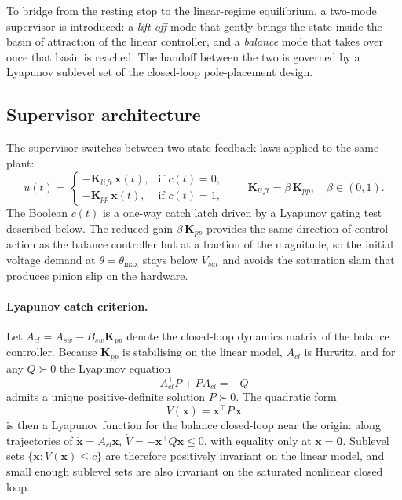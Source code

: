 \documentclass[11pt,a4paper]{article}
\begin{document}
To bridge from the resting stop to the linear-regime equilibrium, a two-mode supervisor is introduced: a \emph{lift-off} mode that gently brings the state inside the basin of attraction of the linear controller, and a \emph{balance} mode that takes over once that basin is reached. The handoff between the two is governed by a Lyapunov sublevel set of the closed-loop pole-placement design.

\subsection{Supervisor architecture}
\label{ssec:liftoff_supervisor}

The supervisor switches between two state-feedback laws applied to the same plant:
\begin{equation}
    u(t) = \begin{cases}
        -\mathbf{K}_{lift}\,\mathbf{x}(t), & \text{if } c(t) = 0,\\
        -\mathbf{K}_{pp}\,\mathbf{x}(t),  & \text{if } c(t) = 1,
    \end{cases}
    \qquad
    \mathbf{K}_{lift} = \beta\,\mathbf{K}_{pp}, \quad \beta \in (0,1).
\end{equation}
The Boolean $c(t)$ is a one-way catch latch driven by a Lyapunov gating test described below. The reduced gain $\beta\,\mathbf{K}_{pp}$ provides the same direction of control action as the balance controller but at a fraction of the magnitude, so the initial voltage demand at $\theta=\theta_{\max}$ stays below $V_{sat}$ and avoids the saturation slam that produces pinion slip on the hardware.

\paragraph{Lyapunov catch criterion.}
Let $A_{cl} = A_{sw} - B_{sw}\mathbf{K}_{pp}$ denote the closed-loop dynamics matrix of the balance controller. Because $\mathbf{K}_{pp}$ is stabilising on the linear model, $A_{cl}$ is Hurwitz, and for any $Q \succ 0$ the Lyapunov equation
\begin{equation}
    A_{cl}^{\top} P + P A_{cl} = -Q
    \label{eq:lyap_eq}
\end{equation}
admits a unique positive-definite solution $P \succ 0$. The quadratic form
\begin{equation}
    V(\mathbf{x}) = \mathbf{x}^{\top} P \,\mathbf{x}
    \label{eq:lyap_V}
\end{equation}
is then a Lyapunov function for the balance closed-loop near the origin: along trajectories of $\dot{\mathbf{x}}=A_{cl}\mathbf{x}$, $\dot V = -\mathbf{x}^{\top}Q\mathbf{x} \leq 0$, with equality only at $\mathbf{x}=\mathbf{0}$. Sublevel sets $\{\mathbf{x}:V(\mathbf{x})\le c\}$ are therefore positively invariant on the linear model, and small enough sublevel sets are also invariant on the saturated nonlinear closed loop.
\end{document}
